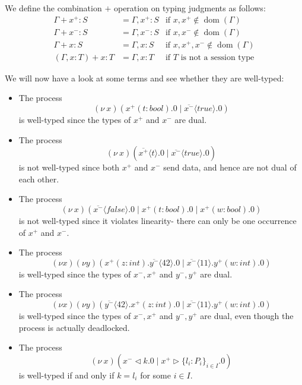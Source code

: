 \documentclass[a4paper, openany]{memoir}
\theoremstyle{definition}
\begin{document}
    We define the combination $+$ operation on typing judgments as follows:
    \begin{align*}
        \Gamma + x^+ \colon S &= \Gamma, x^+ \colon S & \textrm{if } x, x^+ \not\in \operatorname{dom}(\Gamma) \\
        \Gamma + x^- \colon S &= \Gamma, x^- \colon S & \textrm{if } x, x^- \not\in \operatorname{dom}(\Gamma) \\
        \Gamma + x \colon S &= \Gamma, x \colon S & \textrm{if } x, x^+, x^- \not\in \operatorname{dom}(\Gamma) \\
        (\Gamma, x \colon T) + x \colon T &= \Gamma, x \colon T & \textrm{if } T \textrm{ is not a session type}
    \end{align*}

    We will now have a look at some terms and see whether they are well-typed:
    \begin{itemize}
        \item The process
        \[(\nu \ x)(x^+(t \colon \textit{bool}).0 \mid \overline{x^-} \langle \textit{true} \rangle.0)\]
        is well-typed since the types of $x^+$ and $x^-$ are dual.

        \item The process
        \[(\nu \ x)(\overline{x^+} \langle t \rangle.0 \mid \overline{x^-}\langle \textit{true} \rangle.0)\]
        is not well-typed since both $x^+$ and $x^-$ send data, and hence are not dual of each other.
        
        \item The process
        \[(\nu \ x)(\overline{x^-} \langle \textit{false} \rangle.0 \mid x^+ (t \colon \textit{bool}).0 \mid x^+(w \colon \textit{bool}).0)\]
        is not well-typed since it violates linearity- there can only be one occurrence of $x^+$ and $x^-$.

        \item The process
        \[(\nu x)(\nu y)(x^+(z \colon \textit{int}).\overline{y^-}\langle 42 \rangle.0 \mid \overline{x^-} \langle 11 \rangle.y^+(w \colon \textit{int}).0)\]
        is well-typed since the types of $x^-, x^+$ and $y^-, y^+$ are dual.

        \item The process
        \[(\nu x)(\nu y)(\overline{y^-}\langle 42 \rangle.x^+(z \colon \textit{int}).0 \mid \overline{x^-} \langle 11 \rangle.y^+(w \colon \textit{int}).0)\]
        is well-typed since the types of $x^-, x^+$ and $y^-, y^+$ are dual, even though the process is actually deadlocked.

        \item The process
        \[(\nu \ x)(x^- \vartriangleleft k.0 \mid x^+ \vartriangleright \{l_i \colon P_i\}_{i \in I}.0)\]
        is well-typed if and only if $k = l_i$ for some $i \in I$.
    \end{itemize}
\end{document}
